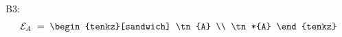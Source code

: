 \documentclass[varwidth=16cm, border=6pt]{standalone}
\begin{document}
B3:
\[
  \mathcal{E}_A \;=\;
  \begin{tenkz}[sandwich]
    \tn{A} \\
    \tn*{A}
  \end{tenkz}
\]
\end{document}
